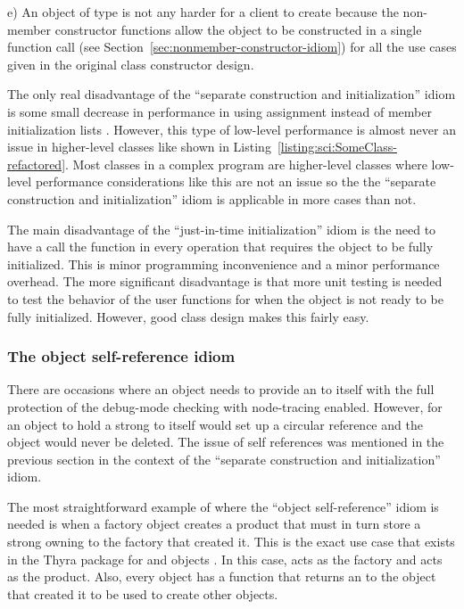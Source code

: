 \documentclass[pdf,ps2pdf,11pt]{SANDreport}
\begin{document}
e) An object of type {} is not any harder for a client
to create because the non-member constructor functions allow the
object to be constructed in a single function call (see
Section~\ref{sec:nonmember-constructor-idiom}) for all the use cases
given in the original class constructor design.

The only real disadvantage of the ``separate construction and
initialization'' idiom is some small decrease in performance in using
assignment instead of member initialization lists {}\cite[Item
4]{EffectiveC++ThirdEdition}.  However, this type of low-level
performance is almost never an issue in higher-level classes like
{} shown in
Listing~\ref{listing:sci:SomeClass-refactored}.  Most classes in a
complex program are higher-level classes where low-level performance
considerations like this are not an issue so the the ``separate
construction and initialization'' idiom is applicable in more cases
than not.

The main disadvantage of the ``just-in-time initialization'' idiom is
the need to have a call the function {} in
every operation that requires the object to be fully initialized.
This is minor programming inconvenience and a minor performance
overhead.  The more significant disadvantage is that more unit testing
is needed to test the behavior of the user functions for when the
object is not ready to be fully initialized.  However, good class
design makes this fairly easy.


%
{}\subsubsection{The object self-reference idiom}
\label{sec:self-references}
%

There are occasions where an object needs to provide an {} to
itself with the full protection of the debug-mode checking with
node-tracing enabled.  However, for an object to hold a strong
{} to itself would set up a circular reference and the object
would never be deleted.  The issue of self references was mentioned in
the previous section in the context of the ``separate construction and
initialization'' idiom.

The most straightforward example of where the ``object
self-reference'' idiom is needed is when a factory object creates a
product that must in turn store a strong owning {} to the
factory that created it.  This is the exact use case that exists in
the Thyra package for {} and {}
objects {}\cite{ThyraOperatorVectorSAND}.  In this case,
{} acts as the factory and {}
acts as the product.  Also, every {} object has a
function {} that returns an {} to the
{} object that created it to be used to create
other {} objects.
\end{document}
